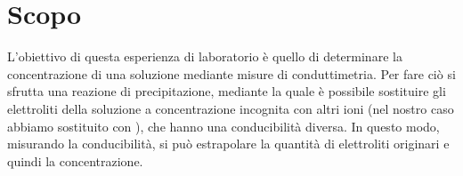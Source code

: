 \section*{Scopo}

L'obiettivo di questa esperienza di laboratorio è quello di determinare la concentrazione
di una soluzione mediante misure di conduttimetria. Per fare ciò si sfrutta una reazione di
precipitazione, mediante la quale è possibile sostituire gli elettroliti della soluzione
a concentrazione incognita con altri ioni (nel nostro caso abbiamo sostituito  con ),
che hanno una conducibilità diversa. In questo modo, misurando la conducibilità, si può
estrapolare la quantità di elettroliti originari e quindi la concentrazione.
